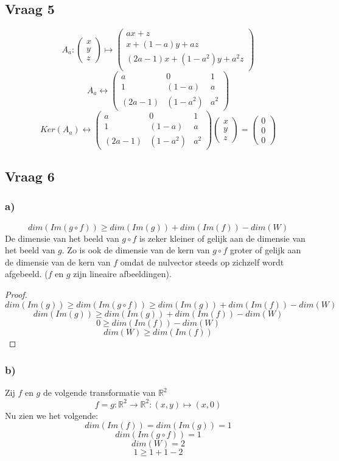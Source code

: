 \documentclass[lineaire_algebra_oplossingen.tex]{subfiles}
\begin{document}
\subsection{Vraag 5}
\[
A_a:
\begin{pmatrix}
x\\y\\z
\end{pmatrix}
\mapsto
\begin{pmatrix}
ax+z\\
x+(1-a)y+az\\
(2a-1)x+(1-a^2)y+a^2z\\
\end{pmatrix}
\]
\[
A_a \leftrightarrow
\begin{pmatrix}
a & 0 & 1\\
1 & (1-a) & a\\
(2a-1) & (1-a^2) & a^2
\end{pmatrix}
\]
\[
Ker(A_a) \leftrightarrow
\begin{pmatrix}
a & 0 & 1\\
1 & (1-a) & a\\
(2a-1) & (1-a^2) & a^2
\end{pmatrix}
\begin{pmatrix}
x\\y\\z
\end{pmatrix}
=
\begin{pmatrix}
0\\0\\0
\end{pmatrix}
\]

\subsection{Vraag 6}
\subsubsection*{a)}
\[
dim(Im(g\circ f)) \ge dim(Im(g)) + dim(Im(f)) - dim(W)
\]
De dimensie van het beeld van $g \circ f$ is zeker kleiner of gelijk aan de dimensie van het beeld van $g$. Zo is ook de dimensie van de kern van $g \circ f$ groter of gelijk aan de dimensie van de kern van $f$ omdat de nulvector steeds op zichzelf wordt afgebeeld. ($f$ en $g$ zijn lineaire afbeeldingen).
\begin{proof}
\[
dim(Im(g)) \ge dim(Im(g\circ f)) \ge dim(Im(g)) + dim(Im(f)) - dim(W)
\]
\[
dim(Im(g)) \ge dim(Im(g)) + dim(Im(f)) - dim(W)
\]
\[
0 \ge dim(Im(f)) - dim(W)
\]
\[
dim(W) \ge dim(Im(f))
\]
\end{proof}

\subsubsection*{b)}
Zij $f$ en $g$ de volgende transformatie van $\mathbb{R}^2$
\[
f = g : \mathbb{R}^2 \rightarrow \mathbb{R}^2: (x,y) \mapsto (x,0)
\]
Nu zien we het volgende:
\[
dim(Im(f)) = dim(Im(g)) = 1
\]
\[
dim(Im(g\circ f)) = 1
\]
\[
dim(W) = 2
\]
\[
1 \ge 1 + 1 - 2
\]
\end{document}
